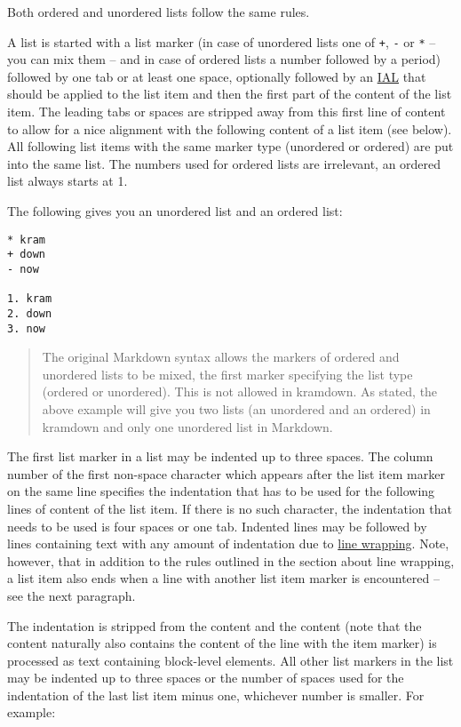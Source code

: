 \documentclass[a4paper]{article}
\begin{document}
Both ordered and unordered lists follow the same rules.

A list is started with a list marker (in case of unordered lists one of
\texttt{+}, \texttt{-} or \texttt{*} -- you can mix them -- and in case
of ordered lists a number followed by a period) followed by one tab or
at least one space, optionally followed by an
\protect\hyperlink{inline-attribute-lists}{IAL} that should be applied
to the list item and then the first part of the content of the list
item. The leading tabs or spaces are stripped away from this first line
of content to allow for a nice alignment with the following content of a
list item (see below). All following list items with the same marker
type (unordered or ordered) are put into the same list. The numbers used
for ordered lists are irrelevant, an ordered list always starts at 1.

The following gives you an unordered list and an ordered list:

\begin{verbatim}
* kram
+ down
- now

1. kram
2. down
3. now
\end{verbatim}

\begin{quote}
The original Markdown syntax allows the markers of ordered and unordered
lists to be mixed, the first marker specifying the list type (ordered or
unordered). This is not allowed in kramdown. As stated, the above
example will give you two lists (an unordered and an ordered) in
kramdown and only one unordered list in Markdown.
\end{quote}

The first list marker in a list may be indented up to three spaces. The
column number of the first non-space character which appears after the
list item marker on the same line specifies the indentation that has to
be used for the following lines of content of the list item. If there is
no such character, the indentation that needs to be used is four spaces
or one tab. Indented lines may be followed by lines containing text with
any amount of indentation due to \protect\hyperlink{line-wrapping}{line
wrapping}. Note, however, that in addition to the rules outlined in the
section about line wrapping, a list item also ends when a line with
another list item marker is encountered -- see the next paragraph.

The indentation is stripped from the content and the content (note that
the content naturally also contains the content of the line with the
item marker) is processed as text containing block-level elements. All
other list markers in the list may be indented up to three spaces or the
number of spaces used for the indentation of the last list item minus
one, whichever number is smaller. For example:
\end{document}
